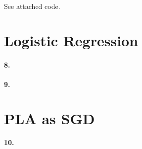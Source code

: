 \documentclass[10pt,letter]{article}
\begin{document}
	See attached code. 

\section*{Logistic Regression}

\paragraph{8.} 

\paragraph{9.} 

\section*{PLA as SGD}

\paragraph{10.} 
\end{document}
